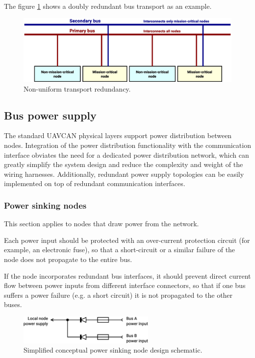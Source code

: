 The figure \ref{fig:phy_non_uniform_transport_redundancy} shows a doubly redundant bus transport as an example.

\begin{figure}[H]
    \centering
	\includegraphics[width=\textwidth]{physical_layer/non_uniform_bus_redundancy}
	\caption{Non-uniform transport redundancy.\label{fig:phy_non_uniform_transport_redundancy}}
\end{figure}

\subsection{Bus power supply}

The standard UAVCAN physical layers support power distribution between nodes.
Integration of the power distribution functionality with the communication interface
obviates the need for a dedicated power distribution network,
which can greatly simplify the system design and reduce the complexity and weight of the wiring harnesses.
Additionally, redundant power supply topologies can be easily implemented on top of redundant communication interfaces.

\subsubsection{Power sinking nodes}

This section applies to nodes that draw power from the network.

Each power input should be protected with an over-current protection circuit (for example, an electronic fuse),
so that a short-circuit or a similar failure of the node does not propagate to the entire bus.

If the node incorporates redundant bus interfaces,
it should prevent direct current flow between power inputs from different interface connectors,
so that if one bus suffers a power failure (e.g. a short circuit) it is not propagated to the other buses.

\begin{figure}[H]
    \centering
	\includegraphics[width=0.6\textwidth]{physical_layer/redundant_bus_power_sink}
	\caption{Simplified conceptual power sinking node design schematic.\label{fig:phy_redundant_bus_power_sink}}
\end{figure}


